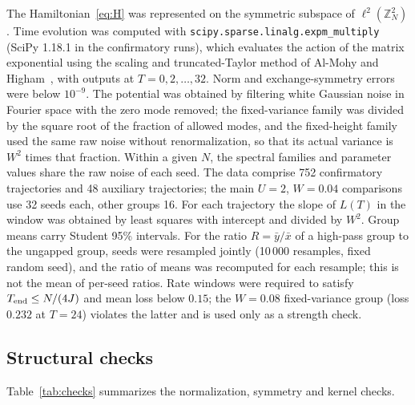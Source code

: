 \documentclass[12pt,a4paper]{article}
\theoremstyle{remark}
\begin{document}
The Hamiltonian~\eqref{eq:H} was represented on the symmetric subspace of $\ell^2(\mathbb{Z}_N^2)$. Time evolution was computed with \texttt{scipy.sparse.linalg.expm\_multiply} (SciPy 1.18.1 in the confirmatory runs), which evaluates the action of the matrix exponential using the scaling and truncated-Taylor method of Al-Mohy and Higham~\cite{AlMohyHigham2011}, with outputs at $T=0,2,\dots,32$. Norm and exchange-symmetry errors were below $10^{-9}$. The potential was obtained by filtering white Gaussian noise in Fourier space with the zero mode removed; the fixed-variance family was divided by the square root of the fraction of allowed modes, and the fixed-height family used the same raw noise without renormalization, so that its actual variance is $W^2$ times that fraction. Within a given $N$, the spectral families and parameter values share the raw noise of each seed. The data comprise 752 confirmatory trajectories and 48 auxiliary trajectories; the main $U=2$, $W=0.04$ comparisons use 32 seeds each, other groups 16. For each trajectory the slope of $L(T)$ in the window was obtained by least squares with intercept and divided by $W^2$. Group means carry Student 95\% intervals. For the ratio $R=\bar y/\bar x$ of a high-pass group to the ungapped group, seeds were resampled jointly (10\,000 resamples, fixed random seed), and the ratio of means was recomputed for each resample; this is not the mean of per-seed ratios. Rate windows were required to satisfy $T_{\rm end}\le N/(4J)$ and mean loss below $0.15$; the $W=0.08$ fixed-variance group (loss $0.232$ at $T=24$) violates the latter and is used only as a strength check.

\subsection{Structural checks}\label{app:checks}

Table~\ref{tab:checks} summarizes the normalization, symmetry and kernel checks.
\end{document}
